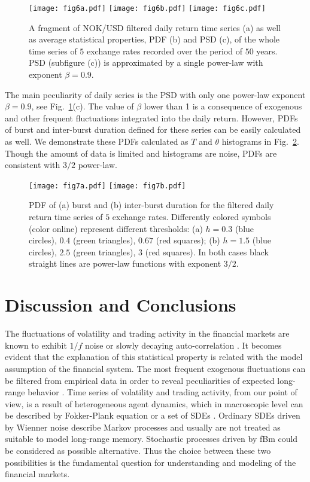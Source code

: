 \documentclass{article}
\newcommand\figref[1]{Fig.~\ref{#1}}
\begin{document}
\begin{figure}[h]
\centering
\texttt{[image: fig6a.pdf]}
\texttt{[image: fig6b.pdf]}
\texttt{[image: fig6c.pdf]}
\caption{\label{fig6} A fragment of NOK/USD filtered daily return time series (a) as well as average statistical properties, PDF (b) and PSD (c), of the whole time series of $5$ exchange rates recorded over the period of $50$ years. PSD (subfigure (c)) is approximated by a single power-law with exponent $\beta=0.9$.}
\end{figure}

The main peculiarity of daily series is the PSD with only one power-law exponent $\beta=0.9$, see \figref{fig6}(c). The value of $\beta$ lower than 1 is a consequence of exogenous and other frequent fluctuations integrated into the daily return. However, PDFs of burst and inter-burst duration defined for these series can be easily calculated as well. We demonstrate these PDFs calculated as $T$ and $\theta$ histograms in \figref{fig7}. Though the amount of data is limited and histograms are noise, PDFs are consistent with $3/2$ power-law. 

\begin{figure}[h]
\centering
\texttt{[image: fig7a.pdf]}
\texttt{[image: fig7b.pdf]}
\caption{\label{fig7} PDF of (a) burst and (b) inter-burst duration for the filtered daily return time series of $5$ exchange rates. Differently colored symbols (color online) represent different thresholds: (a) $h=0.3$ (blue circles), $0.4$ (green triangles), $0.67$ (red squares); (b) $h=1.5$ (blue circles), $2.5$ (green triangles), $3$ (red squares). In both cases black straight lines are power-law functions with exponent $3/2$.}
\end{figure}

\section{Discussion and Conclusions}
\label{sec:conclusion}

The fluctuations of volatility and trading activity in the financial markets are known to exhibit $1/f$ noise or slowly decaying auto-correlation \cite{Engle2001QF,Plerou2001QF,Gabaix2003Nature,Ding2003Springer}. It becomes evident that the explanation of this statistical property is related with the model assumption of the financial system. The most frequent exogenous fluctuations can be filtered from empirical data in order to reveal  peculiarities of expected long-range behavior \cite{Gontis2016APPA}. Time series of volatility and trading activity, from our point of view, is a result of heterogeneous agent dynamics, which in macroscopic level can be described by Fokker-Plank equation or a set of SDEs \cite{Kononovicius2013EPL,Gontis2014PlosOne,Gontis2016PhysA}. Ordinary SDEs driven by Wienner noise describe Markov processes and usually are not treated as suitable to model long-range memory. Stochastic processes driven by fBm could be considered as possible alternative. Thus the choice between these two possibilities is the fundamental question for understanding and modeling of the financial markets.
\end{document}
